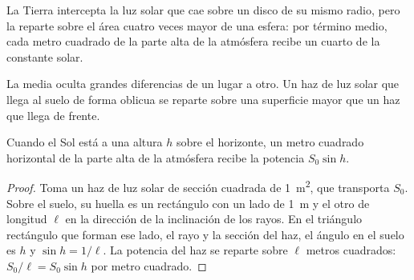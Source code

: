 \begin{omfigure}

{\small La Tierra intercepta la luz solar que cae sobre un disco de su mismo
radio, pero la reparte sobre el área cuatro veces mayor de una esfera: por
término medio, cada metro cuadrado de la parte alta de la atmósfera recibe
un cuarto de la constante solar.}
\end{omfigure}

La media oculta grandes diferencias de un lugar a otro. Un haz de luz solar
que llega al suelo de forma oblicua se reparte sobre una superficie mayor que
un haz que llega de frente.

\begin{proposition}\label{prop:g10:earth-energy-budget:height}
Cuando el Sol está a una altura $h$ sobre el horizonte, un metro cuadrado
horizontal de la parte alta de la atmósfera recibe la potencia $S_0 \sin h$.
\end{proposition}

\begin{proof}
Toma un haz de luz solar de sección cuadrada de \qty{1}{m^2}, que transporta
$S_0$. Sobre el suelo, su huella es un rectángulo con un lado de \qty{1}{m}
y el otro de longitud $\ell$ en la dirección de la inclinación de los rayos.
En el triángulo rectángulo que forman ese lado, el rayo y la sección del
haz, el ángulo en el suelo es $h$ y $\sin h = 1/\ell$. La potencia del haz
se reparte sobre $\ell$ metros cuadrados: $S_0/\ell = S_0 \sin h$ por metro
cuadrado.
\end{proof}

